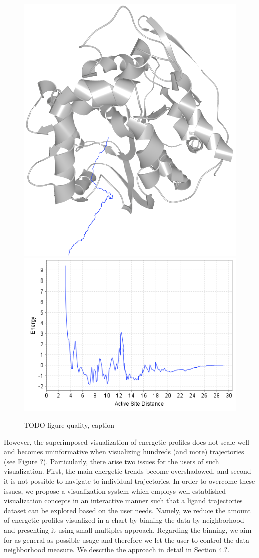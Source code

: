 \documentclass{vgtc}                          %
\begin{document}
\begin{figure}[htb]
  \centering
  \includegraphics[width=0.5\columnwidth]{trajectory}\\
  \vspace{1em}
  \includegraphics[width=0.8\columnwidth]{trajectory-energy}
  \caption{TODO figure quality, caption}
  \label{fig:trajectory}
\end{figure}

However, the superimposed visualization of energetic profiles does not scale well and becomes uninformative when visualizing hundreds (and more) trajectories (see Figure ?).
Particularly, there arise two issues for the users of such visualization. First, the main energetic trends become overshadowed, and second it is not possible to navigate to individual trajectories.
In order to overcome these issues, we propose a visualization system which employs well established visualization concepts in an interactive manner such that a ligand trajectories dataset can be explored based on the user needs.
Namely, we reduce the amount of energetic profiles visualized in a chart by binning the data by neighborhood and presenting it using small multiples approach.
Regarding the binning, we aim for as general as possible usage and therefore we let the user to control the data neighborhood measure.
We describe the approach in detail in Section 4.?.
\end{document}
